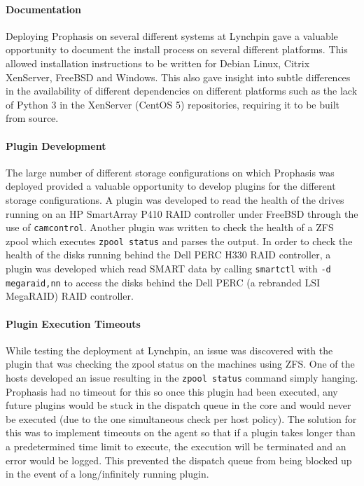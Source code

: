 \documentclass[bsc,deptreport,twoside,parskip,singlespacing,notimes]{infthesis}
\begin{document}
\paragraph*{Documentation}
	Deploying Prophasis on several different systems at Lynchpin gave a valuable
	opportunity to document the install process on several different platforms.
	This allowed installation instructions to be written for Debian Linux,
	Citrix XenServer, FreeBSD and Windows.  This also gave insight into subtle
	differences in the availability of different dependencies on different
	platforms such as the lack of Python 3 in the XenServer (CentOS 5)
	repositories, requiring it to be built from source.

\paragraph*{Plugin Development}
	The large number of different storage configurations on which Prophasis was
	deployed provided a valuable opportunity to develop plugins for the different
	storage configurations.  A plugin was developed to read the health of the
	drives running on an HP SmartArray P410 RAID controller under FreeBSD through
	the use of \texttt{camcontrol}.  Another plugin was written to check the
	health of a ZFS zpool which executes \texttt{zpool status} and parses the
	output.  In order to check the health of the disks running behind the Dell PERC
	H330 RAID controller, a plugin was developed which read SMART data by calling
	\texttt{smartctl} with \texttt{-d megaraid,nn} to access the disks behind the
	Dell PERC (a rebranded LSI MegaRAID) RAID controller.

\paragraph*{Plugin Execution Timeouts}
	While testing the deployment at Lynchpin, an issue was discovered with the
	plugin that was checking the zpool status on the machines using ZFS. One of the
	hosts developed an issue resulting in the \texttt{zpool status} command simply
	hanging.  Prophasis had no timeout for this so once this plugin had been
	executed, any future plugins would be stuck in the dispatch queue in the core
	and would never be executed (due to the one simultaneous check per host
	policy).  The solution for this was to implement timeouts on the agent so that
	if a plugin takes longer than a predetermined time limit to execute, the
	execution will be terminated and an error would be logged.  This prevented
	the dispatch queue from being blocked up in the event of a long/infinitely
	running plugin.
\end{document}
